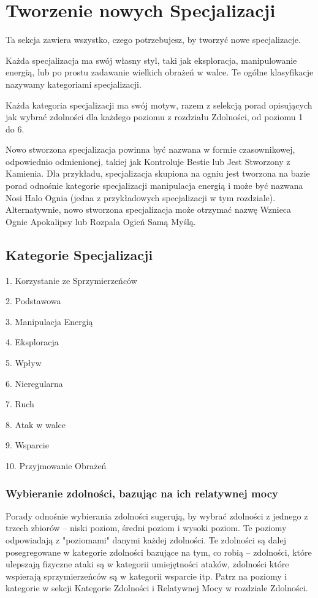 \section{Tworzenie nowych Specjalizacji}

Ta sekcja zawiera wszystko, czego potrzebujesz, by tworzyć nowe specjalizacje. 

Każda specjalizacja ma swój własny styl, taki jak eksploracja, manipulowanie energią, lub po prostu zadawanie wielkich obrażeń w walce. Te ogólne klasyfikacje nazywamy kategoriami specjalizacji.

Każda kategoria specjalizacji ma swój motyw, razem z selekcją porad opisujących jak wybrać zdolności dla każdego poziomu z rozdziału Zdolności, od poziomu 1 do 6.

Nowo stworzona specjalizacja powinna być nazwana w formie czasownikowej, odpowiednio odmienionej, takiej jak Kontroluje Bestie lub Jest Stworzony z Kamienia. Dla przykładu, specjalizacja skupiona na ogniu jest tworzona na bazie porad odnośnie kategorie specjalizacji manipulacja energią i może być nazwana Nosi Halo Ognia (jedna z przykładowych specjalizacji w tym rozdziale). Alternatywnie, nowo stworzona specjalizacja może otrzymać nazwę Wznieca Ognie Apokalipsy lub Rozpala Ogień Samą Myślą. 

\subsection{Kategorie Specjalizacji}

 1. Korzystanie ze Sprzymierzeńców
   
2. Podstawowa
   
3. Manipulacja Energią
   
4. Eksploracja
   
5. Wpływ
   
6. Nieregularna
   
7. Ruch
   
8. Atak w walce
   
9. Wsparcie
   
10. Przyjmowanie Obrażeń

\subsubsection{Wybieranie zdolności, bazując na ich relatywnej mocy}

Porady odnośnie wybierania zdolności sugerują, by wybrać zdolności z jednego z trzech zbiorów – niski poziom, średni poziom i wysoki poziom. Te poziomy odpowiadają z "poziomami" danymi każdej zdolności. Te zdolności są dalej posegregowane w kategorie zdolności bazujące na tym, co robią – zdolności, które ulepszają fizyczne ataki są w kategorii umiejętności ataków, zdolności które wspierają sprzymierzeńców są w kategorii wsparcie itp. Patrz na poziomy i kategorie w sekcji Kategorie Zdolności i Relatywnej Mocy w rozdziale Zdolności.

